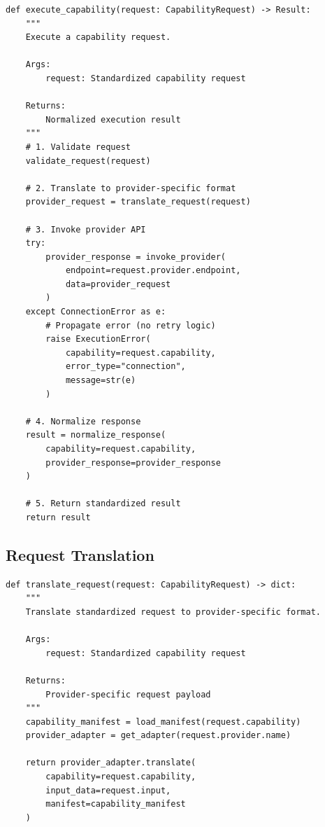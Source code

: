 \begin{lstlisting}[style=pythonstyle]
def execute_capability(request: CapabilityRequest) -> Result:
    """
    Execute a capability request.

    Args:
        request: Standardized capability request

    Returns:
        Normalized execution result
    """
    # 1. Validate request
    validate_request(request)

    # 2. Translate to provider-specific format
    provider_request = translate_request(request)

    # 3. Invoke provider API
    try:
        provider_response = invoke_provider(
            endpoint=request.provider.endpoint,
            data=provider_request
        )
    except ConnectionError as e:
        # Propagate error (no retry logic)
        raise ExecutionError(
            capability=request.capability,
            error_type="connection",
            message=str(e)
        )

    # 4. Normalize response
    result = normalize_response(
        capability=request.capability,
        provider_response=provider_response
    )

    # 5. Return standardized result
    return result
\end{lstlisting}

\subsection{Request Translation}

\begin{lstlisting}[style=pythonstyle]
def translate_request(request: CapabilityRequest) -> dict:
    """
    Translate standardized request to provider-specific format.

    Args:
        request: Standardized capability request

    Returns:
        Provider-specific request payload
    """
    capability_manifest = load_manifest(request.capability)
    provider_adapter = get_adapter(request.provider.name)

    return provider_adapter.translate(
        capability=request.capability,
        input_data=request.input,
        manifest=capability_manifest
    )
\end{lstlisting}
